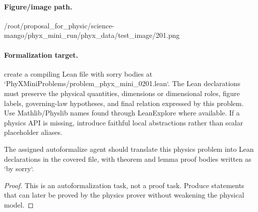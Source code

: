 \paragraph{Figure/image path.}
/root/proposal\_for\_physic/science-mango/phyx\_mini\_run/phyx\_data/test\_image/201.png

\paragraph{Formalization target.}
create a compiling Lean file with sorry bodies at `PhyXMiniProblems/problem\_phyx\_mini\_0201.lean`. The Lean declarations must preserve the physical quantities, dimensions or dimensional roles, figure labels, governing-law hypotheses, and final relation expressed by this problem.
Use Mathlib/Physlib names found through LeanExplore where available. If a physics API is missing, introduce faithful local abstractions rather than scalar placeholder aliases.

\begin{theorem}
\label{thm:physics:phyx_mini_0201:target}
The assigned autoformalize agent should translate this physics problem into Lean declarations in the covered file, with theorem and lemma proof bodies written as `by sorry`.
\end{theorem}
\begin{proof}
This is an autoformalization task, not a proof task. Produce statements that can later be proved by the physics prover without weakening the physical model.
\end{proof}

